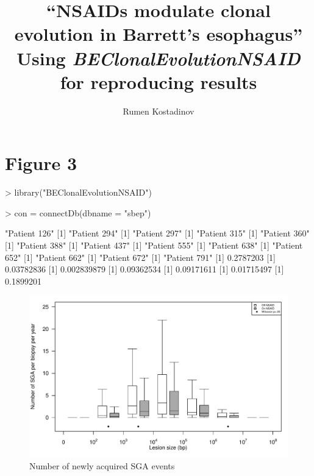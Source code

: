 \documentclass[12pt]{article}
\newcommand{\Rpackage}[1]{{\textit{#1}}}
\begin{document}

\title{``NSAIDs modulate clonal evolution in Barrett's esophagus'' \\Using \Rpackage{BEClonalEvolutionNSAID} for reproducing results}
\author{Rumen Kostadinov}
\maketitle

\section{Figure 3}



\begin{Schunk}
\begin{Sinput}
> library("BEClonalEvolutionNSAID")
\end{Sinput}
\end{Schunk}

\begin{Schunk}
\begin{Sinput}
> con = connectDb(dbname = "sbep")
\end{Sinput}
\end{Schunk}


\begin{Schunk}
\begin{Soutput}
[1] "Patient 126"
[1] "Patient 294"
[1] "Patient 297"
[1] "Patient 315"
[1] "Patient 360"
[1] "Patient 388"
[1] "Patient 437"
[1] "Patient 555"
[1] "Patient 638"
[1] "Patient 652"
[1] "Patient 662"
[1] "Patient 672"
[1] "Patient 791"
[1] 0.2787203
[1] 0.03782836
[1] 0.002839879
[1] 0.09362534
[1] 0.09171611
[1] 0.01715497
[1] 0.1899201
\end{Soutput}
\end{Schunk}


\begin{figure}[t!]
  \centering
  \includegraphics[width=\textwidth]{figures/guide-Figure3A.pdf}
  \caption{\label{fig:f3a} Number of newly acquired SGA events  }
\end{figure}
\end{document}
